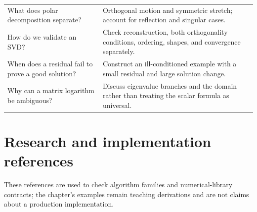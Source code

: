{\begin{longtable}[]{@{}
  >{\raggedright\arraybackslash}p{}
  >{\raggedright\arraybackslash}p{}@{}}
What does polar decomposition separate? & Orthogonal motion and symmetric stretch; account for reflection and singular cases. \\
How do we validate an SVD? & Check reconstruction, both orthogonality conditions, ordering, shapes, and convergence separately. \\
When does a residual fail to prove a good solution? & Construct an ill-conditioned example with a small residual and large solution change. \\
Why can a matrix logarithm be ambiguous? & Discuss eigenvalue branches and the domain rather than treating the scalar formula as universal. \\
\end{longtable}
}

\section{Research and implementation references}\label{02-foundations-ii-ch039-research-and-implementation-references}

These references are used to check algorithm families and numerical-library contracts; the chapter's examples remain teaching derivations and are not claims about a production implementation.

